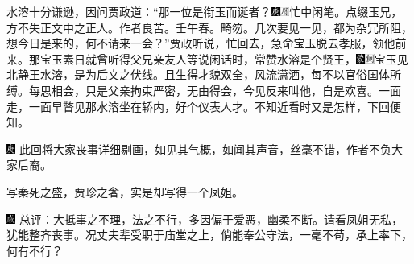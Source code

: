 水溶十分谦逊，因问贾政道：“那一位是衔玉而诞者？{\includegraphics[width=3mm]{../Images/00004}\includegraphics[width=3mm]{../Images/00010}\footnotesize \kaishu 忙中闲笔。点缀玉兄，方不失正文中之正人。作者良苦。壬午春。畸笏。}几次要见一见，都为杂冗所阻，想今日是来的，何不请来一会？”贾政听说，忙回去，急命宝玉脱去孝服，领他前来。那宝玉素日就曾听得父兄亲友人等说闲话时，常赞水溶是个贤王，{\includegraphics[width=3mm]{../Images/00006}\includegraphics[width=3mm]{../Images/00011}\footnotesize \kaishu 宝玉见北静王水溶，是为后文之伏线。}且生得才貌双全，风流潇洒，每不以官俗国体所缚。每思相会，只是父亲拘束严密，无由得会，今见反来叫他，自是欢喜。一面走，一面早瞥见那水溶坐在轿内，好个仪表人才。不知近看时又是怎样，下回便知。

{{\includegraphics[width=3mm]{../Images/00004}  \kaishu 此回将大家丧事详细剔画，如见其气概，如闻其声音，丝毫不错，作者不负大家后裔。}}

{{写秦死之盛，贾珍之奢，实是却写得一个凤姐。}}

{\includegraphics[width=3mm]{../Images/00005} \kaishu 总评：大抵事之不理，法之不行，多因偏于爱恶，幽柔不断。请看凤姐无私，犹能整齐丧事。况丈夫辈受职于庙堂之上，倘能奉公守法，一毫不苟，承上率下，何有不行？}